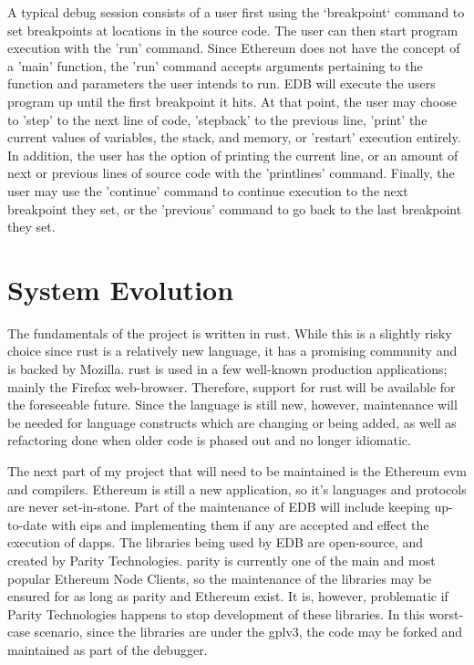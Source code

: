 \documentclass{report}
\begin{document}
A typical debug session consists of a user first using the `breakpoint` command to set breakpoints at locations in the source code. The user can then start program execution with the 'run' command. Since Ethereum does not have the concept of a 'main' function, the 'run' command accepts arguments pertaining to the function and parameters the user intends to run. EDB will execute the users program up until the first breakpoint it hits. At that point, the user may choose to 'step' to the next line of code, 'stepback' to the previous line, 'print' the current values of variables, the stack, and memory, or 'restart' execution entirely. In addition, the user has the option of printing the current line, or an amount of next or previous lines of source code with the 'printlines' command. Finally, the user may use the 'continue' command to continue execution to the next breakpoint they set, or the 'previous' command to go back to the last breakpoint they set.

\section{System Evolution}

The fundamentals of the project is written in \Gls{rust}. While this is a slightly risky choice since \Gls{rust} is a relatively new language, it has a promising community and is backed by Mozilla. \Gls{rust} is used in a few well-known production applications; mainly the Firefox web-browser. Therefore, support for \Gls{rust} will be available for the foreseeable future. Since the language is still new, however, maintenance will be needed for language constructs which are changing or being added, as well as refactoring done when older code is phased out and no longer idiomatic. 

The next part of my project that will need to be maintained is the Ethereum \gls{evm} and compilers. Ethereum is still a new application, so it's languages and protocols are never set-in-stone. Part of the maintenance of EDB will include keeping up-to-date with \glspl{eip} and implementing them if any are accepted and effect the execution of \glspl{dapp}. The libraries being used by EDB are open-source, and created by Parity Technologies. \Gls{parity} is currently one of the main and most popular Ethereum Node Clients, so the maintenance of the libraries may be ensured for as long as \Gls{parity} and Ethereum exist. It is, however, problematic if Parity Technologies happens to stop development of these libraries. In this worst-case scenario, since the libraries are under the \gls{gplv3}, the code may be forked and maintained as part of the debugger.  

\printglossary[title={Glossary | Index}]
\end{document}
